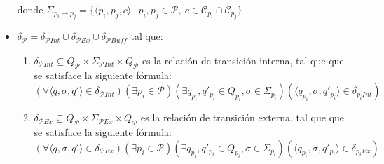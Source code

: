 \begin{definition}[Composición]
\begin{itemize}
donde $\Sigma_\mathit{p_i \mapsto p_j} =\{ \langle p_i,p_j,c \rangle \ | \ p_i, p_j \in \mathcal{P}, \  c \in \mathcal{C}_{p_i} \cap \mathcal{C}_{p_j}\}$
\item $\delta_{\mathcal{P}} = \delta_{\mathcal{P}\mathit{Int}} \cup \delta_{\mathcal{P}\mathit{Ex}} \cup \delta_{\mathcal{P}\mathit{Buff}}$ tal que:
\begin{enumerate}
\item $\delta_{\mathcal{P}\mathit{Int}} \subseteq Q_{\mathcal{P}} \times \Sigma_{\mathcal{P} Int} \times Q_{\mathcal{P}}$  es la relación de transición interna, tal que que se satisface la siguiente fórmula:
$$(\forall \langle q, \sigma, q' \rangle \in \delta_{\mathcal{P}\mathit{Int}})(\exists p_i \in \mathcal{P})(\exists q_{p_i}, q'_{p_i} \in Q_{p_i}, \sigma \in \Sigma_{p_i})(\langle q_{p_i}, \sigma, q'_{p_i} \rangle \in \delta_{p_i Int})$$

\item $\delta_{\mathcal{P}\mathit{Ex}} \subseteq Q_{\mathcal{P}} \times \Sigma_{\mathcal{P}\mathit{Ex}} \times Q_{\mathcal{P}}$ es la relación de transición externa, tal que que se satisface la siguiente fórmula: $$(\forall \langle q, \sigma, q' \rangle \in \delta_{\mathcal{P}\mathit{Ex}}) (\exists p_i \in \mathcal{P})(\exists q_{p_i},q'_{p_i} \in Q_{p_i}, \sigma \in \Sigma_{p_i}) (\langle q_{p_i},\sigma,q'_{p_i} \rangle \in \delta_{p_i Ex})$$


\end{enumerate}
\end{itemize}
\end{definition}
